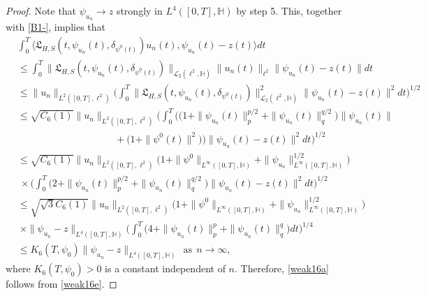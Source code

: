 \documentclass[11pt]{article}
\renewcommand{\leq}{\leqslant}
\numberwithin{equation}{section}
\begin{document}
\begin{proof}
Note that $\psi_{u_n}\rightarrow z$ strongly in $L^{4}([0,T],\mathbb{H})$ by step 5. This,
together with \eqref{B1-}, implies that
\begin{align}\label{weak16e}
& \int_0^T\big\langle\mathfrak{L}_{H,S}
 (t,\psi_{u_n}(t),
\delta_{\psi^0(t)})u_n(t) , \psi_{u_n}(t)-z(t)\big\rangle dt
\nonumber\\
&\leq\int_0^T
\|\mathfrak{L}_{H,S}
 (t,\psi_{u_n}(t),
\delta_{\psi^0(t)})\|_{\mathcal{L}_2(\ell^2
,\mathbb{H})}\|u_n(t)\|_{\ell^2}
\| \psi_{u_n}(t)-z(t)\| dt
\nonumber\\
&\leq\|u_n
   \|_{L^2([0,T],\ell^2 )}
\bigg(\int_0^T
\|\mathfrak{L}_{H,S}
 (t,\psi_{u_n}(t),
\delta_{\psi^0(t)})\|^2_{\mathcal{L}_2(\ell^2
,\mathbb{H})}\|\psi_{u_n}(t)-z(t)\|^2 dt\bigg)^{1/2}
\nonumber\\
&\leq\sqrt{C_6(1)}\|u_n
   \|_{L^2([0,T],\ell^2 )}
\bigg(\int_0^T
\Big(\big(1+\|\psi_{u_n}(t)\|^{p/2}_{p}+
 \| \psi_{u_n}(t)\|^{q/2}_{q}\big)\|\psi_{u_n}(t)\|
\nonumber\\
& \ \ \ \ \ \ \ \ \ \ \ \ \    \   \ \ \ \ \ \ \ \ \ \ \ \ \ \ \   \   \ \ \ \ \ \ \ \ \ \ \ \ \ \ \  +\big(1+\|\psi^0(t)\|^2\big)\Big)
\|\psi_{u_n}(t)-z(t)\|^2  dt\bigg)^{1/2}
\nonumber\\
&\leq\sqrt{C_6(1)}\|u_n
   \|_{L^2([0,T],\ell^2 )}\big(1+\|\psi^0
   \|_{L^\infty([0,T],\mathbb{H})}+\|\psi_{u_n}
   \|^{1/2}_{L^\infty([0,T],\mathbb{H})}\big)
\nonumber\\
&\ \times\bigg(\int_0^T
\big(2+\|\psi_{u_n}(t)\|^{p/2}_{p}+
 \| \psi_{u_n}(t)\|^{q/2}_{q}\big)
\|\psi_{u_n}(t)-z(t)\|^2  dt\bigg)^{1/2}
\nonumber\\
&\leq\sqrt{\sqrt{3}C_6(1)}\|u_n
   \|_{L^2([0,T],\ell^2 )}\big(1+\|\psi^0
   \|_{L^\infty([0,T],\mathbb{H})}+\|\psi_{u_n}
   \|^{1/2}_{L^\infty([0,T],\mathbb{H})}\big)
\nonumber\\
&\ \times\|\psi_{u_n}
-z\|_{L^4([0,T],\mathbb{H})}\bigg(\int_0^T
\big(4+\|\psi_{u_n}(t)\|^{p}_{p}+
 \| \psi_{u_n}(t)\|^{q}_{q}\big)
 dt\bigg)^{1/4}
\nonumber\\
&\leq K_6(T,\psi_0)\|\psi_{u_n}
-z\|_{L^4([0,T],\mathbb{H})}\ \ \mbox{as}\ \ n\rightarrow\infty,
\end{align}where $K_6(T,\psi_0)>0$ is a constant independent of $n$. Therefore, \eqref{weak16a} follows from \eqref{weak16e}.


\end{proof}
\end{document}
